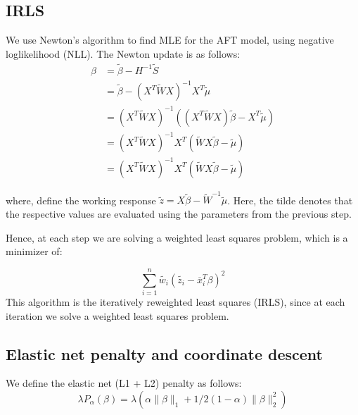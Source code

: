 \documentclass[12pt,a4paper]{report}
\begin{document}
\subsection*{IRLS}
We use Newton's algorithm to find MLE for the AFT model, using negative loglikelihood (NLL). The Newton update is as follows:
\begin{equation}
\begin{split}
\beta & = \widetilde{\beta} - H^{-1}\widetilde{S} \\ 
 	  & = \widetilde{\beta} - (X^T \widetilde{W} X)^{-1} X^T \widetilde{\mu} \\
 	  & = (X^T \widetilde{W} X)^{-1} ((X^T \widetilde{W} X) \widetilde{\beta} -  X^T \widetilde{\mu} ) \\
 	  & = (X^T \widetilde{W} X)^{-1} X^T (\widetilde{W} X \widetilde{\beta} -  \widetilde{\mu} ) \\
 	  & = (X^T \widetilde{W} X)^{-1} X^T (\widetilde{W} X \widetilde{\beta} -  \widetilde{\mu} )
\end{split}
\end{equation}

where, define the working response $\widetilde{z} = X \widetilde{\beta} - \widetilde{W}^{-1} \widetilde{\mu}$.
Here, the tilde denotes that the respective values are evaluated using the parameters from the previous step.

Hence, at each step we are solving a weighted least squares problem, which is a minimizer of:

\begin{equation} \label{z_i}
\sum_{i=1}^n \widetilde{w_i} (\widetilde{z_i} - \overline x_i^T \beta)^2
\end{equation}
%
%
This algorithm is the iteratively reweighted least squares (IRLS), since at each iteration we solve a weighted least squares problem.

\subsection*{Elastic net penalty and coordinate descent}
We define the elastic net (L1 + L2) penalty as follows:
\begin{equation} \label{objective}
\lambda P_{\alpha}(\beta) = \lambda(\alpha \|\beta\|_1 + 1/2 (1-\alpha) \|\beta\|_2^2)
\end{equation}
\end{document}
